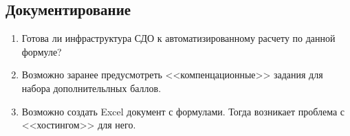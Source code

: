\documentclass[10pt,a4paper]{article}
\begin{document}
    \subsection{Документирование}
    \begin{enumerate}
        \item Готова ли инфраструктура СДО к автоматизированному расчету по данной формуле?
        \item Возможно заранее предусмотреть <<компенцационные>> задания для набора дополнительлных баллов.
        \item Возможно создать Excel документ с формулами. Тогда возникает проблема с <<хостингом>> для него.
    \end{enumerate}

\end{document}
